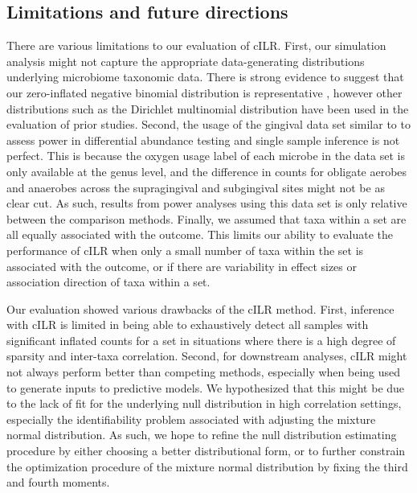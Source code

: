 \documentclass[10pt,letterpaper]{article}
\begin{document}
\subsection*{Limitations and future directions} 
There are various limitations to our evaluation of cILR. First, our simulation analysis might not capture the appropriate data-generating distributions underlying microbiome taxonomic data. There is strong evidence to suggest that our zero-inflated negative binomial distribution is representative \cite{calgaro2020}, however other distributions such as the Dirichlet multinomial distribution \cite{wu2016} have been used in the evaluation of prior studies. Second, the usage of the gingival data set similar to \cite{calgaro2020} to assess power in differential abundance testing and single sample inference is not perfect. This is because the oxygen usage label of each microbe in the data set is only available at the genus level, and the difference in counts for obligate aerobes and anaerobes across the supragingival and subgingival sites might not be as clear cut. As such, results from power analyses using this data set is only relative between the comparison methods. Finally, we assumed that taxa within a set are all equally associated with the outcome. This limits our ability to evaluate the performance of cILR when only a small number of taxa within the set is associated with the outcome, or if there are variability in effect sizes or association direction of taxa within a set. 

Our evaluation showed various drawbacks of the cILR method. First, inference with cILR is limited in being able to exhaustively detect all samples with significant inflated counts for a set in situations where there is a high degree of sparsity and inter-taxa correlation. Second, for downstream analyses, cILR might not always perform better than competing methods, especially when being used to generate inputs to predictive models. We hypothesized that this might be due to the lack of fit for the underlying null distribution in high correlation settings, especially the identifiability problem associated with adjusting the mixture normal distribution. As such, we hope to refine the null distribution estimating procedure by either choosing a better distributional form, or to further constrain the optimization procedure of the mixture normal distribution by fixing the third and fourth moments. 
\end{document}
